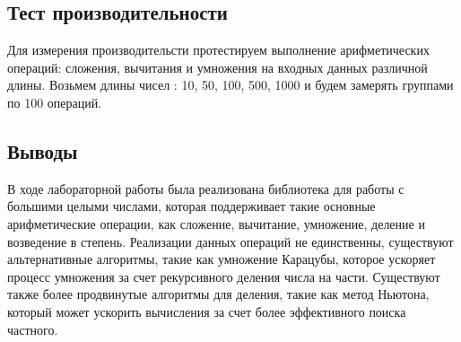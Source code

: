\documentclass[12pt]{article}
\begin{document}
\subsection*{Тест производительности}

Для измерения производительсти протестируем выполнение арифметических операций: сложения, вычитания и умножения на входных данных различной длины. Возьмем длины чисел : 10, 50, 100, 500, 1000 и будем замерять группами по 100 операций.
	


\subsection*{Выводы}

В ходе лабораторной работы была реализована библиотека для работы с большими целыми числами, которая поддерживает такие основные арифметические операции, как сложение, вычитание, умножение, деление и возведение в степень. Реализации данных операций не единственны, существуют альтернативные алгоритмы, такие как умножение Карацубы, которое ускоряет процесс умножения за счет рекурсивного деления числа на части. Существуют также более продвинутые алгоритмы для деления, такие как метод Ньютона, который может ускорить вычисления за счет более эффективного поиска частного.
\end{document}
